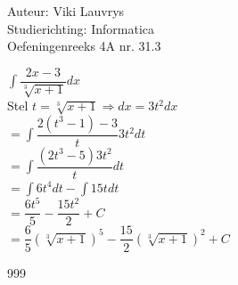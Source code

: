 \documentclass[a4paper]{article}
\begin{document}
  
\noindent \large Auteur: Viki	Lauvrys \\
\noindent \large Studierichting: Informatica\\
\noindent \large Oefeningenreeks 4A nr. 31.3\\

\medskip

\normalsize

$ \displaystyle\int \dfrac{2x -3}{\sqrt[3]{x+1}} dx $ \\

Stel $ t = \sqrt[3]{x+1} \Rightarrow dx = 3t^2 dx $ \\

$ = \displaystyle\int \dfrac{2(t^3 -1) -3}{t} 3t^2 dt $ \\

$ = \displaystyle\int \dfrac{(2t^3 -5) 3t^2}{t} dt $ \\

$ = \displaystyle\int 6t^4 dt - \displaystyle\int 15t dt $ \\

$ = \dfrac{6t^5}{5} - \dfrac{15t^2}{2} +C $ \\

$ = \dfrac{6}{5} \left(\sqrt[3]{x+1} \right)^5 - \dfrac{15}{2} \left(\sqrt[3]{x+1} \right)^2 +C $ \\

\begin{thebibliography}{999}
\end{thebibliography}
\end{document}
